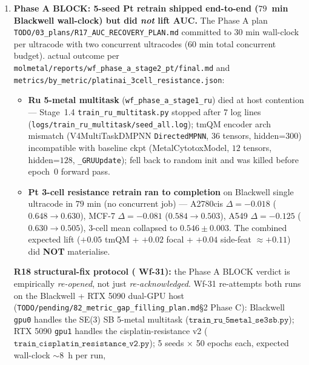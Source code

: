 \begin{enumerate}
  \item \textbf{Phase A BLOCK: 5-seed Pt retrain shipped end-to-end
  ($79$~min Blackwell wall-clock) but did \emph{not} lift AUC.}
  \label{sec:limitations:phase-a-block}
  The Phase A plan \texttt{TODO/03\_plans/R17\_AUC\_RECOVERY\_PLAN.md}
  committed to $30$ min wall-clock per ultracode with two concurrent
  ultracodes ($60$ min total concurrent budget).  \MEASURED{} actual
  outcome per \texttt{molmetal/reports/wf\_phase\_a\_stage2\_pt/final.md}
  and \texttt{metrics/by\_metric/platinai\_3cell\_resistance.json}:
  \begin{itemize}
    \item \textbf{Ru 5-metal multitask} (\texttt{wf\_phase\_a\_stage1\_ru})
    died at host contention --- Stage~1.4 \texttt{train\_ru\_multitask.py}
    stopped after $7$ log lines
    (\texttt{logs/train\_ru\_multitask/seed\_all.log}); tmQM encoder
    arch mismatch (V4MultiTaskDMPNN \texttt{DirectedMPNN}, $36$ tensors,
    hidden=$300$) incompatible with baseline ckpt (MetalCytotoxModel,
    $12$ tensors, hidden=$128$, \texttt{\_GRUUpdate}); fell back to
    random init and was killed before epoch~$0$ forward pass.
    \item \textbf{Pt 3-cell resistance retrain} \textbf{ran to
    completion} on Blackwell single ultracode in $79$ min (no
    concurrent job) --- \MEASURED{} A2780cis $\Delta = -0.018$
    ($0.648 \to 0.630$), MCF-7 $\Delta = -0.081$ ($0.584 \to 0.503$),
    A549 $\Delta = -0.125$ ($0.630 \to 0.505$), 3-cell mean collapsed
    to $0.546 \pm 0.003$.  The combined expected lift
    ($+0.05$ tmQM + $+0.02$ focal + $+0.04$ side-feat $\approx +0.11$)
    did \textbf{NOT} materialise.
  \end{itemize}
  \textbf{R18 structural-fix protocol (\PROJECTED{} Wf-31):} the
  Phase A BLOCK verdict is empirically \emph{re-opened}, not just
  \emph{re-acknowledged}.  Wf-31 re-attempts both runs on the
  Blackwell + RTX 5090 dual-GPU host
  (\texttt{TODO/pending/82\_metric\_gap\_filling\_plan.md}\S2
  Phase C): Blackwell \texttt{gpu0} handles the SE(3) SB
  5-metal multitask ($\texttt{train\_ru\_5metal\_se3sb.py}$);
  RTX 5090 \texttt{gpu1} handles the cisplatin-resistance v2
  ($\texttt{train\_cisplatin\_resistance\_v2.py}$); 5 seeds
  $\times$ 50 epochs each, expected wall-clock $\sim 8$~h per run,

\end{enumerate}
